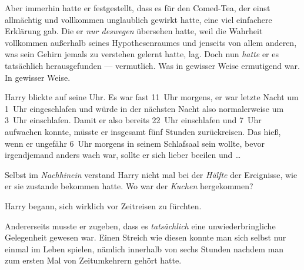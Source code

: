 Aber immerhin hatte er festgestellt, dass es für den Comed-Tea, der einst allmächtig und vollkommen unglaublich gewirkt hatte, eine viel einfachere Erklärung gab. Die er \emph{nur deswegen} übersehen hatte, weil die Wahrheit vollkommen außerhalb seines Hypothesenraumes und jenseits von allem anderen, was sein Gehirn jemals zu verstehen gelernt hatte, lag. Doch nun \emph{hatte} er es tatsächlich herausgefunden — vermutlich. Was in gewisser Weise ermutigend war. In gewisser Weise.

Harry blickte auf seine Uhr. Es war fast 11~Uhr morgens, er war letzte Nacht um 1~Uhr eingeschlafen und würde in der nächsten Nacht also normalerweise um 3~Uhr einschlafen. Damit er also bereits 22~Uhr einschlafen und 7~Uhr aufwachen konnte, müsste er insgesamt fünf Stunden zurückreisen. Das hieß, wenn er ungefähr 6~Uhr morgens in seinem Schlafsaal sein wollte, bevor irgendjemand anders wach war, sollte er sich lieber beeilen und …

Selbst im \emph{Nachhinein} verstand Harry nicht mal bei der \emph{Hälfte} der Ereignisse, wie er sie zustande bekommen hatte. Wo war der \emph{Kuchen} hergekommen?

Harry begann, sich wirklich vor Zeitreisen zu fürchten.

Andererseits musste er zugeben, dass es \emph{tatsächlich} eine unwiederbringliche Gelegenheit gewesen war. Einen Streich wie diesen konnte man sich selbst nur einmal im Leben spielen, nämlich innerhalb von sechs Stunden nachdem man zum ersten Mal von Zeitumkehrern gehört hatte.

